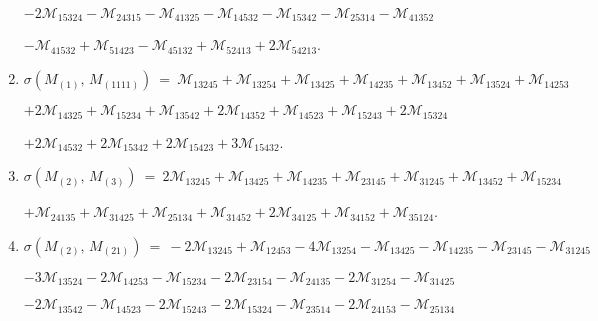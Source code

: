 \documentclass[12pt]{article}
\newcommand{\M}{\mathcal{M}}
\begin{document}
\begin{enumerate}
      \hspace{10pt}
      $-2\M_{15324} 
       -\M_{24315} -\M_{41325} 
       -\M_{14532} -\M_{15342} 
       -\M_{25314} -\M_{41352} $\vspace{-6pt}

      \hspace{10pt}
      $-\M_{41532} +\M_{51423} 
       -\M_{45132} +\M_{52413} 
       +2\M_{54213} $.\vspace{-8pt}
\item[]\hspace{-50pt}$\sigma(M_{(1)},\,M_{(1111)})\ =\ 
        \M_{13245} +\M_{13254} 
       +\M_{13425} +\M_{14235} 
       +\M_{13452} +\M_{13524} 
       +\M_{14253} $\vspace{-6pt}

      \hspace{10pt}
      $+2\M_{14325} 
       +\M_{15234} +\M_{13542} 
       +2\M_{14352} +\M_{14523} 
       +\M_{15243} +2\M_{15324} $\vspace{-6pt}

      \hspace{10pt}
      $+2\M_{14532} +2\M_{15342} 
       +2\M_{15423} +3\M_{15432} $.\vspace{-8pt}
\item[]\hspace{-50pt}$\sigma(M_{(2)},\,M_{(3)})\ =\ 
        2\M_{13245} +\M_{13425} 
       +\M_{14235} +\M_{23145} 
       +\M_{31245} +\M_{13452} 
       +\M_{15234} $\vspace{-6pt}

      \hspace{10pt}
      $+\M_{24135} 
       +\M_{31425} +\M_{25134} 
       +\M_{31452} +2\M_{34125} 
       +\M_{34152} +\M_{35124} $.\vspace{-8pt}
\item[]\hspace{-50pt}$\sigma(M_{(2)},\,M_{(21)})\ =\ 
        -2\M_{13245} +\M_{12453} 
       -4\M_{13254} -\M_{13425} 
       -\M_{14235} -\M_{23145} 
       -\M_{31245} $\vspace{-6pt}

      \hspace{10pt}
      $-3\M_{13524} 
       -2\M_{14253} -\M_{15234} 
       -2\M_{23154} -\M_{24135} 
       -2\M_{31254} -\M_{31425} $\vspace{-6pt}

      \hspace{10pt}
      $-2\M_{13542} -\M_{14523} 
       -2\M_{15243} -2\M_{15324} 
       -\M_{23514} -2\M_{24153} 
       -\M_{25134} $\vspace{-6pt}


\end{enumerate}
\end{document}
